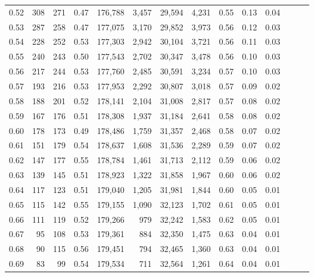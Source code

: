 \begin{tabular}{rrrrrrrrrrrrrr}
0.52 &     308 &    271 &  0.47 &  176,788 &    3,457 &  29,594 &   4,231 &  0.55 &  0.13 &      0.04 \\
0.53 &     287 &    258 &  0.47 &  177,075 &    3,170 &  29,852 &   3,973 &  0.56 &  0.12 &      0.03 \\
0.54 &     228 &    252 &  0.53 &  177,303 &    2,942 &  30,104 &   3,721 &  0.56 &  0.11 &      0.03 \\
0.55 &     240 &    243 &  0.50 &  177,543 &    2,702 &  30,347 &   3,478 &  0.56 &  0.10 &      0.03 \\
0.56 &     217 &    244 &  0.53 &  177,760 &    2,485 &  30,591 &   3,234 &  0.57 &  0.10 &      0.03 \\
0.57 &     193 &    216 &  0.53 &  177,953 &    2,292 &  30,807 &   3,018 &  0.57 &  0.09 &      0.02 \\
0.58 &     188 &    201 &  0.52 &  178,141 &    2,104 &  31,008 &   2,817 &  0.57 &  0.08 &      0.02 \\
0.59 &     167 &    176 &  0.51 &  178,308 &    1,937 &  31,184 &   2,641 &  0.58 &  0.08 &      0.02 \\
0.60 &     178 &    173 &  0.49 &  178,486 &    1,759 &  31,357 &   2,468 &  0.58 &  0.07 &      0.02 \\
0.61 &     151 &    179 &  0.54 &  178,637 &    1,608 &  31,536 &   2,289 &  0.59 &  0.07 &      0.02 \\
0.62 &     147 &    177 &  0.55 &  178,784 &    1,461 &  31,713 &   2,112 &  0.59 &  0.06 &      0.02 \\
0.63 &     139 &    145 &  0.51 &  178,923 &    1,322 &  31,858 &   1,967 &  0.60 &  0.06 &      0.02 \\
0.64 &     117 &    123 &  0.51 &  179,040 &    1,205 &  31,981 &   1,844 &  0.60 &  0.05 &      0.01 \\
0.65 &     115 &    142 &  0.55 &  179,155 &    1,090 &  32,123 &   1,702 &  0.61 &  0.05 &      0.01 \\
0.66 &     111 &    119 &  0.52 &  179,266 &      979 &  32,242 &   1,583 &  0.62 &  0.05 &      0.01 \\
0.67 &      95 &    108 &  0.53 &  179,361 &      884 &  32,350 &   1,475 &  0.63 &  0.04 &      0.01 \\
0.68 &      90 &    115 &  0.56 &  179,451 &      794 &  32,465 &   1,360 &  0.63 &  0.04 &      0.01 \\
0.69 &      83 &     99 &  0.54 &  179,534 &      711 &  32,564 &   1,261 &  0.64 &  0.04 &      0.01 \\

\end{tabular}
